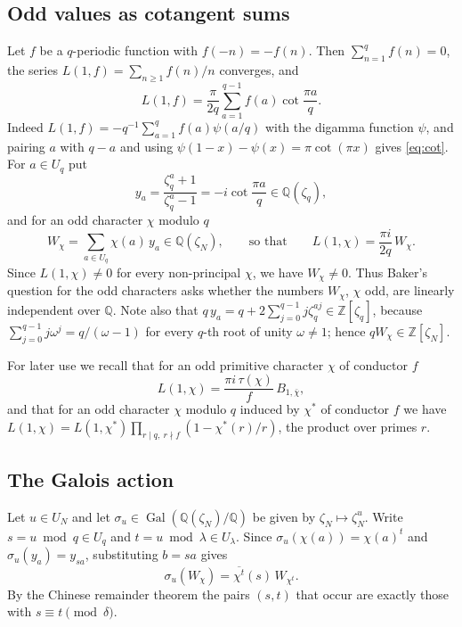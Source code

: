 \documentclass[11pt]{amsart}
\theoremstyle{definition}
\theoremstyle{remark}
\providecommand{\Q}{\mathbb Q}
\providecommand{\Z}{\mathbb Z}
\DeclareMathOperator{\Gal}{Gal}
\numberwithin{equation}{section}
\begin{document}
\subsection{Odd values as cotangent sums}
Let $f$ be a $q$-periodic function with $f(-n)=-f(n)$.
Then $\sum_{n=1}^qf(n)=0$, the series $L(1,f)=\sum_{n\ge1}f(n)/n$ converges, and
\begin{equation}\label{eq:cot}
L(1,f)=\frac{\pi}{2q}\sum_{a=1}^{q-1}f(a)\cot\frac{\pi a}{q}.
\end{equation}
Indeed $L(1,f)=-q^{-1}\sum_{a=1}^{q}f(a)\psi(a/q)$ with the digamma function $\psi$, and pairing $a$ with $q-a$ and using $\psi(1-x)-\psi(x)=\pi\cot(\pi x)$ gives \eqref{eq:cot}.
For $a\in U_q$ put
\[
y_a=\frac{\zeta_q^a+1}{\zeta_q^a-1}=-i\cot\frac{\pi a}{q}\in\Q(\zeta_q),
\]
and for an odd character $\chi$ modulo $q$
\[
W_\chi=\sum_{a\in U_q}\chi(a)\,y_a\in\Q(\zeta_N),\qquad\text{so that}\qquad L(1,\chi)=\frac{\pi i}{2q}\,W_\chi .
\]
Since $L(1,\chi)\neq0$ for every non-principal $\chi$, we have $W_\chi\neq0$.
Thus Baker's question for the odd characters asks whether the numbers $W_\chi$, $\chi$ odd, are linearly independent over $\Q$.
Note also that $q\,y_a=q+2\sum_{j=0}^{q-1}j\zeta_q^{aj}\in\Z[\zeta_q]$, because $\sum_{j=0}^{q-1}j\omega^j=q/(\omega-1)$ for every $q$-th root of unity $\omega\neq1$; hence $qW_\chi\in\Z[\zeta_N]$.

For later use we recall that for an odd primitive character $\chi$ of conductor $f$
\begin{equation}\label{eq:Lprim}
L(1,\chi)=\frac{\pi i\,\tau(\chi)}{f}\,B_{1,\bar\chi},
\end{equation}
and that for an odd character $\chi$ modulo $q$ induced by $\chi^*$ of conductor $f$ we have $L(1,\chi)=L(1,\chi^*)\prod_{r\mid q,\ r\nmid f}(1-\chi^*(r)/r)$, the product over primes $r$.

\subsection{The Galois action}
Let $u\in U_N$ and let $\sigma_u\in\Gal(\Q(\zeta_N)/\Q)$ be given by $\zeta_N\mapsto\zeta_N^u$.
Write $s=u\bmod q\in U_q$ and $t=u\bmod\lambda\in U_\lambda$.
Since $\sigma_u(\chi(a))=\chi(a)^t$ and $\sigma_u(y_a)=y_{sa}$, substituting $b=sa$ gives
\begin{equation}\label{eq:galois}
\sigma_u(W_\chi)=\overline{\chi^t}(s)\,W_{\chi^t}.
\end{equation}
By the Chinese remainder theorem the pairs $(s,t)$ that occur are exactly those with $s\equiv t\pmod\delta$.
\end{document}
